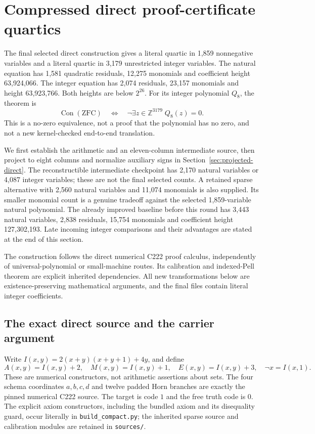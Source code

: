 \documentclass[11pt]{article}
\begin{document}
\section{Compressed direct proof-certificate quartics}
\label{sec:round13-direct}

The final selected direct construction gives a literal quartic in 1,859
nonnegative variables and a literal quartic in 3,179 unrestricted integer
variables.  The natural equation has 1,581 quadratic residuals, 12,275
monomials and coefficient height 63,924,066.  The integer equation has
2,074 residuals, 23,157 monomials and height 63,923,766.  Both heights are
below $2^{26}$.  For its integer polynomial $Q_8$, the theorem is
\[
 \operatorname{Con}(\mathrm{ZFC})
 \quad\Longleftrightarrow\quad
 \neg\exists z\in\mathbb Z^{3179}\;Q_8(z)=0.
\]
This is a no-zero equivalence, not a proof that the polynomial has no zero,
and not a new kernel-checked end-to-end translation.

We first establish the arithmetic and an eleven-column intermediate
source, then project to eight columns and normalize auxiliary signs in
Section~\ref{sec:projected-direct}.  The reconstructible intermediate
checkpoint has 2,170 natural variables or 4,087 integer variables; these
are not the final selected counts.  A retained sparse alternative with
2,560 natural variables and 11,074 monomials is also supplied.  Its smaller
monomial count is a genuine tradeoff against the selected 1,859-variable
natural polynomial.  The already improved baseline before this round has
3,443 natural variables, 2,838 residuals, 15,754 monomials and coefficient
height 127,302,193.  Late incoming integer comparisons and their advantages
are stated at the end of this section.

The construction follows the direct numerical C222 proof calculus,
independently of universal-polynomial or small-machine routes.  Its
calibration and indexed-Pell theorem are explicit inherited dependencies.
All new transformations below are existence-preserving mathematical
arguments, and the final files contain literal integer coefficients.

\subsection{The exact direct source and the carrier argument}

Write $I(x,y)=2(x+y)(x+y+1)+4y$, and define
\[
 A(x,y)=I(x,y)+2,\quad M(x,y)=I(x,y)+1,\quad
 E(x,y)=I(x,y)+3,\quad \neg x=I(x,1).
\]
These are numerical constructors, not arithmetic assertions about sets.
The four schema coordinates $a,b,c,d$ and twelve padded Horn branches are
exactly the pinned numerical C222 source.  The target is code $1$ and the
free truth code is $0$.  The explicit axiom constructors, including the
bundled axiom and its disequality guard, occur literally in
\texttt{build\_compact.py}; the inherited sparse source and calibration
modules are retained in \texttt{sources/}.
\end{document}
